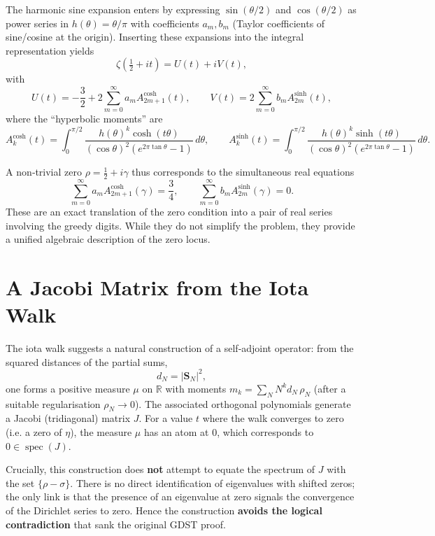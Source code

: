 \documentclass[11pt,a4paper]{article}
\newcommand{\R}{\mathbb{R}}
\newcommand{\spec}{\operatorname{spec}}
\begin{document}
The harmonic sine expansion enters by expressing \(\sin(\theta/2)\) and \(\cos(\theta/2)\) as power series in \(h(\theta)=\theta/\pi\) with coefficients \(a_m,b_m\) (Taylor coefficients of sine/cosine at the origin).  Inserting these expansions into the integral representation yields
\[
\zeta(\tfrac12+it)=U(t)+iV(t),
\]
with
\[
U(t)=-\frac32+2\sum_{m=0}^\infty a_m A_{2m+1}^{\cosh}(t),\qquad
V(t)= 2\sum_{m=0}^\infty b_m A_{2m}^{\sinh}(t),
\]
where the ``hyperbolic moments'' are
\[
A_k^{\cosh}(t)=\int_0^{\pi/2}\frac{h(\theta)^k\cosh(t\theta)}{(\cos\theta)^2(e^{2\pi\tan\theta}-1)}\,d\theta,\qquad
A_k^{\sinh}(t)=\int_0^{\pi/2}\frac{h(\theta)^k\sinh(t\theta)}{(\cos\theta)^2(e^{2\pi\tan\theta}-1)}\,d\theta.
\]

A non‑trivial zero \(\rho=\frac12+i\gamma\) thus corresponds to the simultaneous real equations
\begin{equation}\label{zero-system}
\sum_{m=0}^\infty a_m A_{2m+1}^{\cosh}(\gamma)=\frac34,\qquad
\sum_{m=0}^\infty b_m A_{2m}^{\sinh}(\gamma)=0.
\end{equation}
These are an exact translation of the zero condition into a pair of real series involving the greedy digits.  While they do not simplify the problem, they provide a unified algebraic description of the zero locus.

\section{A Jacobi Matrix from the Iota Walk}
\label{sec:Jacobi}

The iota walk suggests a natural construction of a self‑adjoint operator: from the squared distances of the partial sums,
\[
d_N = |\mathbf{S}_N|^2,
\]
one forms a positive measure \(\mu\) on \(\R\) with moments \(m_k = \sum_N N^k d_N\,\rho_N\) (after a suitable regularisation \(\rho_N\to0\)).  The associated orthogonal polynomials generate a Jacobi (tridiagonal) matrix \(J\).  For a value \(t\) where the walk converges to zero (i.e. a zero of \(\eta\)), the measure \(\mu\) has an atom at \(0\), which corresponds to \(0\in\spec(J)\).

Crucially, this construction does \textbf{not} attempt to equate the spectrum of \(J\) with the set \(\{\rho-\sigma\}\).  There is no direct identification of eigenvalues with shifted zeros; the only link is that the presence of an eigenvalue at zero signals the convergence of the Dirichlet series to zero.  Hence the construction \textbf{avoids the logical contradiction} that sank the original GDST proof.
\end{document}
